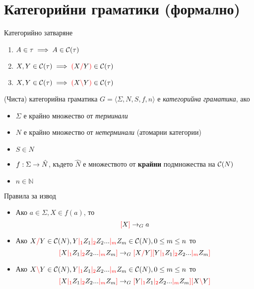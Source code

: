 \documentclass[9pt]{beamer}
\begin{document}
  \section{Категорийни граматики (формално)}
  \begin{frame}{Категорийно затваряне}
    \begin{enumerate}
        \item \label{itm:atomic} $A \in \tau \implies A \in \mathcal{C}( \tau )$
        \item \label{itm:right}  $X, Y \in \mathcal{C}( \tau ) \implies \textcolor{red}{(} X \textcolor{red}{/} Y \textcolor{red}{)} \in \mathcal{C}( \tau )$
        \item \label{itm:left}   $X, Y \in \mathcal{C}( \tau ) \implies \textcolor{red}{(} X \textcolor{red}{\backslash} Y \textcolor{red}{)} \in \mathcal{C}( \tau )$
    \end{enumerate}
  \end{frame}

  \begin{frame}{(Чиста) категорийна граматика}
    $ G = \langle \Sigma, N, S, f, n \rangle $ е \emph{категорийна граматика}, ако
    \begin{itemize}
        \item $ \Sigma $ е крайно множество от \emph{терминали}
        \item $ N $ е крайно множество от \emph{нетерминали} (атомарни категории)
        \item $ S \in N $
        \item $ f : \Sigma \rightarrow \hat{N} $, където $\hat{N}$ е множеството от
            \textbf{крайни} подмножества на $\mathcal{C}( N )$
        \item $ n \in \mathbb{N} $
    \end{itemize}
  \end{frame}

  \begin{frame}{Правила за извод}
    \begin{itemize}
        \item Ако $ a \in \Sigma, X \in f(a) $, то \[ \textcolor{red}{[} X \textcolor{red}{]} \rightarrow_G a \]
        \item Ако $ X \textcolor{red}{/} Y \in \mathcal{C}( N ), Y \textcolor{red}{|_{1}} Z_1 \textcolor{red}{|_{2}} Z_2 ... \textcolor{red}{|_{m}} Z_m \in \mathcal{C}( N ), 0 \leq m \leq n $
            то \[ \textcolor{red}{[} X \textcolor{red}{|_{1}} Z_1 \textcolor{red}{|_{2}} Z_2 ... \textcolor{red}{|_{m}} Z_m \textcolor{red}{]} \rightarrow_G \textcolor{red}{[} X \textcolor{red}{/} Y \textcolor{red}{]} \textcolor{red}{[} Y \textcolor{red}{|_{1}} Z_1 \textcolor{red}{|_{2}} Z_2 ... \textcolor{red}{|_{m}} Z_m \textcolor{red}{]} \]
        \item Ако $ X \textcolor{red}{\backslash} Y \in \mathcal{C}( N ), Y \textcolor{red}{|_{1}} Z_1 \textcolor{red}{|_{2}} Z_2 ... \textcolor{red}{|_{m}} Z_m \in \mathcal{C}( N ), 0 \leq m \leq n $
            то \[ \textcolor{red}{[} X \textcolor{red}{|_{1}} Z_1 \textcolor{red}{|_{2}} Z_2 ... \textcolor{red}{|_{m}} Z_m \textcolor{red}{]} \rightarrow_G \textcolor{red}{[} Y \textcolor{red}{|_{1}} Z_1 \textcolor{red}{|_{2}} Z_2 ... \textcolor{red}{|_{m}} Z_m \textcolor{red}{]} \textcolor{red}{[} X \textcolor{red}{\backslash} Y \textcolor{red}{]} \]
    \end{itemize}
  \end{frame}
\end{document}
